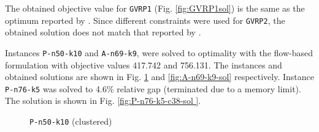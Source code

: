 \documentclass[letterpaper,12pt,onehalfspacing,twoside]{article}
\theoremstyle{msds}
\begin{document}
The obtained objective value for \texttt{GVRP1} (Fig. \ref{fig:GVRP1sol}) is the same as the optimum reported by \cite{POP201297}. Since different constraints were used for \texttt{GVRP2}, the obtained solution does not match that reported by \cite{bektasKara}.

Instances \texttt{P-n50-k10} and \texttt{A-n69-k9}, were solved to optimality with the flow-based formulation with objective values 417.742 and 756.131. The instances and obtained solutions are shown in Fig. \ref{fig:P-n50-k10-sol} and \ref{fig:A-n69-k9-sol} respectively. Instance \texttt{P-n76-k5} was solved to 4.6\% relative gap (terminated due to a memory limit). The solution is shown in Fig. \ref{fig:P-n76-k5-c38-sol }.

\begin{figure}[htbp]
\centering
{}
\quad
{}
\caption{\texttt{P-n50-k10} (clustered)}
\label{fig:P-n50-k10-sol}
\end{figure}
\end{document}
